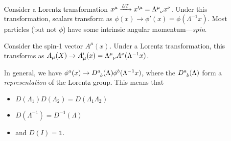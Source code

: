 Consider a Lorentz transformation $x^{\mu} \xrightarrow{LT} x'^{\mu} = \Lambda \indices{^{\mu}_{\nu}} x^{\nu}$. Under this transformation, scalars transform as $\phi(x) \to \phi'(x) = \phi(\Lambda^{-1}x)$.
Most particles (but not $\phi$) have some intrinsic angular momentum---\emph{spin}.
\begin{example}[]
  Consider the spin-1 vector $A^{\mu}(x)$.
  Under a Lorentz transformation, this transforms as $A_{\mu}(X) \to A_{\mu}'(x) = \Lambda \indices{^{\mu}_{\nu}} A^{\nu}(\Lambda^{-1} x)$. 
\end{example}
In general, we have $\phi^a(x) \to D \indices{^a_b} (\Lambda) \phi^b(\Lambda^{-1} x)$, where the $D \indices{^a_b}(\Lambda)$ form a \emph{representation} of the Lorentz group.
This means that
\begin{itemize}
  \item $D(\Lambda_1) D(\Lambda_2) = D(\Lambda_1 \Lambda_2)$
  \item $D(\Lambda^{-1}) = D^{-1}(\Lambda)$
  \item and $D(I) = \mathbb{1}$.
\end{itemize}

